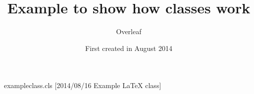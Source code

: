 \begin{filecontents}[overwrite]{exampleclass.cls}
[2014/08/16 Example LaTeX class]

\newcommand{\headlinecolor}{\normalcolor}
\RequirePackage{xcolor}

\DeclareOption{green}{\renewcommand{\headlinecolor}{\color{green}}}
\DeclareOption{red}{\renewcommand{\headlinecolor}{\color{slcolor}}}
\ProcessOptions\relax
{}

\renewcommand{\maketitle}{%
  \twocolumn[%
    \fontsize{50}{60}\fontfamily{phv}\fontseries{b}%
    \fontshape{sl}\selectfont\headlinecolor
    \@title
    \medskip
    ]%
}

\renewcommand{\section}{%
  \@startsection
  {section}{1}{0pt}{-1.5ex plus -1ex minus -.2ex}%
  {1ex plus .2ex}{\large\sffamily\slshape\headlinecolor}%
}

\renewcommand{\normalsize}{\fontsize{9}{10}\selectfont}
\setlength{\textwidth}{17.5cm}
\setlength{\textheight}{22cm}
\setcounter{secnumdepth}{0}
\end{filecontents}

\documentclass[red]{exampleclass}
\usepackage[utf8]{inputenc}
\usepackage[english]{babel}

\usepackage{blindtext}

\title{Example to show how classes work}
\author{Overleaf}
\date{First created in August 2014}



\maketitle

\noindent
Let's begin with a simple working example here.

\blindtext

\section{Introduction}

